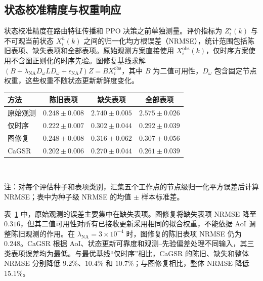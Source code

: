 \subsection{状态校准精度与权重响应}
\label{subsec:ch2_exp_calib}

状态校准精度在路由特征传播和 PPO 决策之前单独测量。评价指标为 $Z_i^\star(k)$ 与不可观当前状态 $X_i^h(k)$ 之间的归一化均方根误差（NRMSE），统计范围包括陈旧表项、缺失表项和全部表项。原始观测方案直接使用 $X_i^{\mathrm{obs}}(k)$，仅时序方案使用不含图正则化的时序先验。图修复基线求解 $(B+\lambda_{\mathrm{NA}}D_{\omega}LD_{\omega}+\epsilon_{\mathrm{NA}}I)Z=BX_i^{\mathrm{obs}}$，其中 $B$ 为二值可用性，$D_\omega$ 包含固定节点权重，这些权重不随状态更新新鲜度变化。

\begin{table}[!htp]
\centering
{}
\label{tab:ch2_calib}
\footnotesize
\setlength{\tabcolsep}{6pt}
\renewcommand{\arraystretch}{1.2}
\begin{tabular}{lccc}
\hline
方法 & 陈旧表项 & 缺失表项 & 全部表项 \\
\hline
原始观测 & $0.248\pm0.008$ & $2.740\pm0.005$ & $2.575\pm0.026$ \\
仅时序 & $0.222\pm0.007$ & $0.302\pm0.044$ & $0.292\pm0.039$ \\
图修复 & $0.248\pm0.008$ & $0.316\pm0.062$ & $0.307\pm0.056$ \\
CaGSR & $\mathbf{0.202\pm0.006}$ & $\mathbf{0.270\pm0.044}$ & $\mathbf{0.261\pm0.039}$ \\
\hline
\end{tabular}
\\[1mm]
\begin{minipage}{0.92\linewidth}
\footnotesize
注：对每个评估种子和表项类别，汇集五个工作点的节点级归一化平方误差后计算 NRMSE；表中为种子级 NRMSE 的均值 $\pm$ 样本标准差。
\end{minipage}
\end{table}

表~\ref{tab:ch2_calib} 中，原始观测的误差主要集中在缺失表项。图修复将缺失表项 NRMSE 降至 $0.316$，但其二值可用性对所有已接收更新采用相同的拟合权重，不能依据 AoI 调整陈旧观测的作用。在 $\lambda_{\mathrm{NA}}=3\times10^{-4}$ 时，图修复的陈旧表项 NRMSE 仍为 $0.248$。CaGSR 根据 AoI、状态更新可靠度和观测--先验偏差处理不同输入，其三类表项误差均为最低。与最优基线“仅时序”相比，CaGSR 的陈旧、缺失和整体 NRMSE 分别降低 $9.2\%$、$10.4\%$ 和 $10.7\%$；与图修复相比，整体 NRMSE 降低 $15.1\%$。

